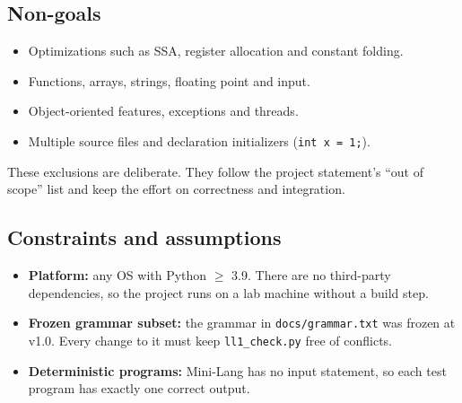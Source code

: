 \documentclass[11pt,letterpaper]{article}
\newcommand{\code}[1]{\texttt{#1}}
\begin{document}
\subsection{Non-goals}
\begin{itemize}
  \item Optimizations such as SSA, register allocation and constant folding.
  \item Functions, arrays, strings, floating point and input.
  \item Object-oriented features, exceptions and threads.
  \item Multiple source files and declaration initializers (\code{int x = 1;}).
\end{itemize}
These exclusions are deliberate. They follow the project statement's ``out of scope'' list and keep the effort on correctness and integration.

\subsection{Constraints and assumptions}
\begin{itemize}
  \item \textbf{Platform:} any OS with Python $\geq$ 3.9. There are no third-party dependencies, so the project runs on a lab machine without a build step.
  \item \textbf{Frozen grammar subset:} the grammar in \code{docs/grammar.txt} was frozen at v1.0. Every change to it must keep \code{ll1\_check.py} free of conflicts.
  \item \textbf{Deterministic programs:} Mini-Lang has no input statement, so each test program has exactly one correct output.
\end{itemize}
\end{document}
